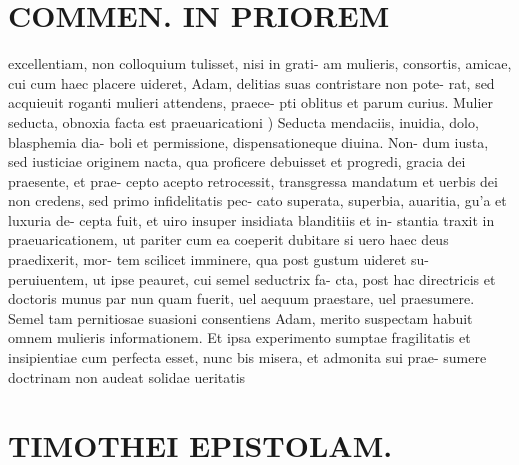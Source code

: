 \documentclass{article}
\begin{document}
\begin{pages}
\section*{COMMEN. IN PRIOREM }
\marginpar{[ p.62 ]}\pstart excellentiam, non colloquium tulisset, nisi in grati- am mulieris, consortis, amicae, cui cum haec placere uideret, Adam, delitias suas contristare non pote- rat, sed acquieuit roganti mulieri attendens, praece- pti oblitus et parum curius.  \pend\pstart Mulier seducta, obnoxia facta est praeuaricationi )  Seducta mendaciis, inuidia, dolo, blasphemia dia- boli et permissione, dispensationeque diuina. Non- dum iusta, sed iusticiae originem nacta, qua proficere debuisset et progredi, gracia dei praesente, et prae- cepto acepto retrocessit, transgressa mandatum et uerbis dei non credens, sed primo infidelitatis pec- cato superata, superbia, auaritia, gu’a et luxuria de- cepta fuit, et uiro insuper insidiata blanditiis et in- stantia traxit in praeuaricationem, ut pariter cum ea coeperit dubitare si uero haec deus praedixerit, mor- tem scilicet imminere, qua post gustum uideret su- peruiuentem, ut ipse peauret, cui semel seductrix fa- cta, post hac directricis et doctoris munus par nun quam fuerit, uel aequum praestare, uel praesumere. Semel tam pernitiosae suasioni consentiens Adam, merito suspectam habuit omnem mulieris informationem. Et ipsa experimento sumptae fragilitatis et insipientiae cum perfecta esset, nunc bis misera, et admonita sui prae- sumere doctrinam non audeat solidae ueritatis  \pend
\section*{TIMOTHEI EPISTOLAM. }
\marginpar{[ p.63 ]}
{}

\end{pages}
\end{document}
